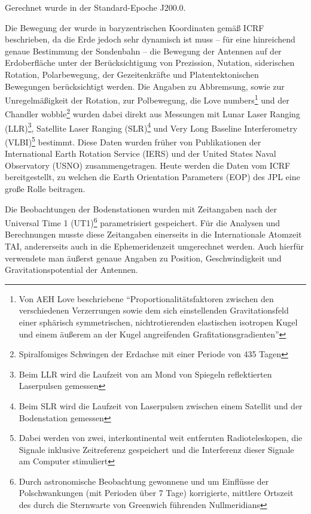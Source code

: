 Gerechnet wurde in der Standard-Epoche J200.0. %

Die Bewegung der wurde in baryzentrischen Koordinaten gemäß ICRF beschrieben, %
da die Erde jedoch sehr dynamisch ist muss – für eine hinreichend genaue Bestimmung der Sondenbahn –
die Bewegung der Antennen auf der Erdoberfläche unter der Berücksichtigung von Prezission, Nutation,
siderischen Rotation, Polarbewegung, der Gezeitenkräfte und Platentektonischen Bewegungen berücksichtigt werden.
Die Angaben zu Abbremsung, sowie zur Unregelmäßigkeit der Rotation, zur Polbewegung, die Love numbers\footnote{Von AEH Love beschriebene ``Proportionalitätsfaktoren zwischen den verschiedenen Verzerrungen sowie dem sich einstellenden Gravitationsfeld einer sphärisch symmetrischen, nichtrotierenden elastischen isotropen Kugel und einem äußerem an der Kugel angreifenden Grafitationsgradienten''\cite{Dittus2006}} und der Chandler wobble\footnote{Spiralfomiges Schwingen
der Erdachse mit einer Periode von 435 Tagen} %
wurden dabei direkt aus Messungen mit Lunar Laser Ranging (LLR)\footnote{Beim LLR wird die Laufzeit von am Mond von Spiegeln reflektierten Laserpulsen gemessen},
Satellite Laser Ranging (SLR)\footnote{Beim SLR wird die Laufzeit von Laserpulsen zwischen einem Satellit und der Bodenstation gemessen} und Very Long Baseline Interferometry
(VLBI)\footnote{Dabei werden von zwei, interkontinental weit entfernten Radioteleskopen, die Signale inklusive
Zeitreferenz gespeichert und die Interferenz dieser Signale am Computer stimuliert} bestimmt.
Diese Daten wurden früher von Publikationen der International Earth Rotation Service (IERS) und der United States Naval Observatory (USNO) zusammengetragen. Heute werden die Daten vom ICRF bereitgestellt, zu welchen die Earth Orientation Parameters
(EOP) des JPL eine große Rolle beitragen.\cite{Anderson2002}

Die Beobachtungen der Bodenstationen wurden mit Zeitangaben nach der Universal Time 1 (UT1)\footnote{Durch astronomische
Beobachtung gewonnene und um Einflüsse der Polschwankungen (mit Perioden über 7 Tage) korrigierte, mittlere Ortszeit des
durch die Sternwarte von Greenwich führenden Nullmeridians} parametrisiert gespeichert. Für die Analysen und
Berechnungen musste diese Zeitangaben einerseits in die Internationale Atomzeit TAI, andererseits auch in die
Ephemeridenzeit umgerechnet werden. Auch hierfür verwendete man äußerst genaue Angaben zu Position, Geschwindigkeit und
Gravitationspotential der Antennen.\cite{Dittus2006}

